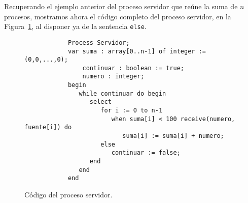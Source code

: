 \begin{ejemplo}
    Recuperando el ejemplo anterior del proceso servidor que reúne la suma de $n$ procesos, mostramos ahora el código completo del proceso servidor, en la Figura~\ref{fig:cod_ejm_select}, al disponer ya de la sentencia \verb|else|.
    \begin{figure}
        \centering
        \begin{verbatim}
            Process Servidor;
            var suma : array[0..n-1] of integer := (0,0,...,0);
                continuar : boolean := true;
                numero : integer;
            begin
               while continuar do begin
                  select 
                     for i := 0 to n-1
                        when suma[i] < 100 receive(numero, fuente[i]) do
                           suma[i] := suma[i] + numero;
                     else 
                        continuar := false;
                  end
               end
            end
        \end{verbatim}
        \caption{Código del proceso servidor.}
        \label{fig:cod_ejm_select}
    \end{figure}
\end{ejemplo}

